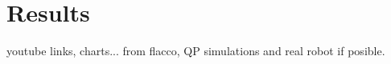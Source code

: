 \chapter{Results}
\label{resultschap}

youtube links, charts... from flacco, QP simulations and real robot if posible.
